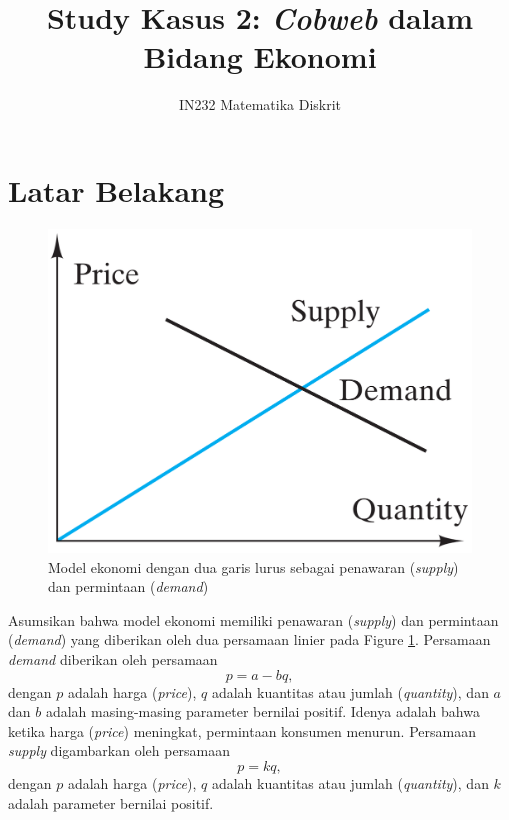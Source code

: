 \documentclass{article}
\title{Study Kasus 2: \textit{Cobweb} dalam Bidang Ekonomi}
\author{IN232 Matematika Diskrit}
\date{}
\theoremstyle{plain}
\begin{document}
\maketitle


\section*{Latar Belakang}
\begin{figure}[!ht]
	\centering
	\includegraphics[scale=.15]{images/model-ekonomi}
	\caption{Model ekonomi dengan dua garis lurus sebagai penawaran (\textit{supply}) dan permintaan (\textit{demand}) \citep{johnsonbaugh2009discrete}}
	\label{fig:model-ekonomi}
\end{figure}
\noindent Asumsikan bahwa model ekonomi memiliki penawaran (\textit{supply}) dan permintaan (\textit{demand}) yang diberikan oleh dua persamaan linier pada Figure \ref{fig:model-ekonomi}. Persamaan \textit{demand} diberikan oleh persamaan 
\begin{equation}
	p = a - bq,
	\label{eq:demand-equation}
\end{equation}
dengan $p$ adalah harga (\textit{price}), $q$ adalah kuantitas atau jumlah (\textit{quantity}), dan $a$ dan $b$ adalah masing-masing parameter bernilai positif. Idenya adalah bahwa ketika harga (\textit{price}) meningkat, permintaan konsumen menurun. Persamaan \textit{supply} digambarkan oleh persamaan
\begin{equation}
	p = kq,
\end{equation}
dengan $p$ adalah harga (\textit{price}), $q$ adalah kuantitas atau jumlah (\textit{quantity}), dan $k$ adalah parameter bernilai positif.
\end{document}
